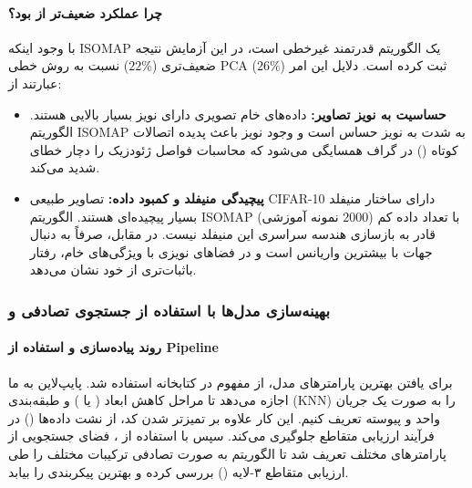 \documentclass{article}
\begin{document}
\paragraph{چرا عملکرد  ضعیف‌تر از  بود؟}
با وجود اینکه ISOMAP یک الگوریتم قدرتمند غیرخطی است، در این آزمایش نتیجه ضعیف‌تری ($22\%$) نسبت به روش خطی PCA ($26\%$) ثبت کرده است. دلایل این امر عبارتند از:
\begin{itemize}
	\item \textbf{حساسیت به نویز تصاویر:} داده‌های خام تصویری دارای نویز بسیار بالایی هستند. الگوریتم ISOMAP به شدت به نویز حساس است و وجود نویز باعث پدیده اتصالات کوتاه () در گراف همسایگی می‌شود که محاسبات فواصل ژئودزیک را دچار خطای شدید می‌کند.
	\item \textbf{پیچیدگی منیفلد و کمبود داده:} تصاویر طبیعی CIFAR-10 دارای ساختار منیفلد بسیار پیچیده‌ای هستند. الگوریتم ISOMAP با تعداد داده کم ($2000$ نمونه آموزشی) قادر به بازسازی هندسه سراسری این منیفلد نیست. در مقابل،  صرفاً به دنبال جهات با بیشترین واریانس است و در فضاهای نویزی با ویژگی‌های خام، رفتار باثبات‌تری از خود نشان می‌دهد.
\end{itemize}
\subsubsection{بهینه‌سازی مدل‌ها با استفاده از جستجوی تصادفی  و }

\paragraph{روند پیاده‌سازی و استفاده از Pipeline}
برای یافتن بهترین پارامترهای مدل، از مفهوم  در کتابخانه  استفاده شد. پایپ‌لاین به ما اجازه می‌دهد تا مراحل کاهش ابعاد ( یا ) و طبقه‌بندی (KNN) را به صورت یک جریان واحد و پیوسته تعریف کنیم. این کار علاوه بر تمیزتر شدن کد، از نشت داده‌ها () در فرآیند ارزیابی متقاطع جلوگیری می‌کند. سپس با استفاده از ، فضای جستجویی از پارامترهای مختلف تعریف شد تا الگوریتم به صورت تصادفی ترکیبات مختلف را طی ارزیابی متقاطع ۳-لایه () بررسی کرده و بهترین پیکربندی را بیابد.
\end{document}
